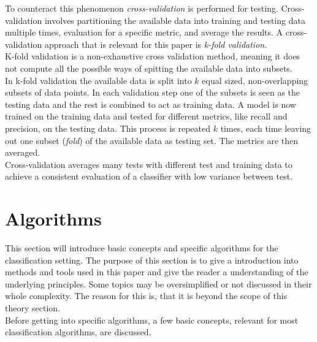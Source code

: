 To counteract this phenomenon \emph{cross-validation} is performed for testing. Cross-validation involves partitioning the available data into training and testing data multiple times, evaluation for a specific metric, and average the results. A cross-validation approach that is relevant for this paper is \emph{k-fold validation}.
\\ 

K-fold validation is a non-exhaustive cross validation method, meaning it does not compute all the possible ways of spitting the available data into subsets. \\
In k-fold validation the available data is split into $k$ equal sized, non-overlapping subsets of data points. In each validation step one of the subsets is seen as the testing data and the rest is combined to act as training data. A model is now trained on the training data and tested for different metrics, like recall and precision, on the testing data. This process is repeated $k$ times, each time leaving out one subset (\emph{fold}) of the available data as testing set. The metrics are then averaged.
\\

Cross-validation averages many tests with different test and training data to achieve a consistent evaluation of a classifier with low variance between test.

\section{Algorithms}
This section will introduce basic concepts and specific algorithms for the classification setting. The purpose of this section is to give a introduction into methods and tools used in this paper and give the reader a understanding of the underlying principles. Some topics may be oversimplified or not discussed in their whole complexity. The reason for this is, that it is beyond the scope of this theory section.
\\

Before getting into specific algorithms, a few basic concepts, relevant for most classification algorithms, are discussed.
\\

